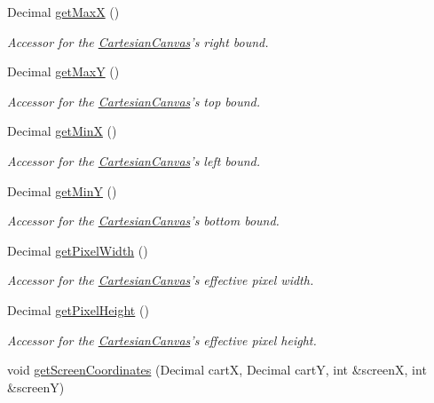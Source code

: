 \begin{DoxyCompactItemize}
\-Decimal \hyperlink{classtsgl_1_1_cartesian_canvas_ae3cbac386f78ecff082b8c4cbd9081ed}{get\-Max\-X} ()
\begin{DoxyCompactList}\small\item\em \-Accessor for the \hyperlink{classtsgl_1_1_cartesian_canvas}{\-Cartesian\-Canvas}'s right bound. \end{DoxyCompactList}\item 
\-Decimal \hyperlink{classtsgl_1_1_cartesian_canvas_a68c0616f8180690423d39e9e83045b8c}{get\-Max\-Y} ()
\begin{DoxyCompactList}\small\item\em \-Accessor for the \hyperlink{classtsgl_1_1_cartesian_canvas}{\-Cartesian\-Canvas}'s top bound. \end{DoxyCompactList}\item 
\-Decimal \hyperlink{classtsgl_1_1_cartesian_canvas_a4ab031c60f6fed675e8163c30c01e5d6}{get\-Min\-X} ()
\begin{DoxyCompactList}\small\item\em \-Accessor for the \hyperlink{classtsgl_1_1_cartesian_canvas}{\-Cartesian\-Canvas}'s left bound. \end{DoxyCompactList}\item 
\-Decimal \hyperlink{classtsgl_1_1_cartesian_canvas_a99c935c99c9a29f2cc918963d734d9a6}{get\-Min\-Y} ()
\begin{DoxyCompactList}\small\item\em \-Accessor for the \hyperlink{classtsgl_1_1_cartesian_canvas}{\-Cartesian\-Canvas}'s bottom bound. \end{DoxyCompactList}\item 
\-Decimal \hyperlink{classtsgl_1_1_cartesian_canvas_ac9bb990b8c34a1575bcb861e4b819372}{get\-Pixel\-Width} ()
\begin{DoxyCompactList}\small\item\em \-Accessor for the \hyperlink{classtsgl_1_1_cartesian_canvas}{\-Cartesian\-Canvas}'s effective pixel width. \end{DoxyCompactList}\item 
\-Decimal \hyperlink{classtsgl_1_1_cartesian_canvas_a699c2b41b3b46bfac8649fb38b24c901}{get\-Pixel\-Height} ()
\begin{DoxyCompactList}\small\item\em \-Accessor for the \hyperlink{classtsgl_1_1_cartesian_canvas}{\-Cartesian\-Canvas}'s effective pixel height. \end{DoxyCompactList}\item 
void \hyperlink{classtsgl_1_1_cartesian_canvas_a8fea34cfcee9bc577c1e1ab6d28a8185}{get\-Screen\-Coordinates} (\-Decimal cart\-X, \-Decimal cart\-Y, int \&screen\-X, int \&screen\-Y)

\end{DoxyCompactItemize}
